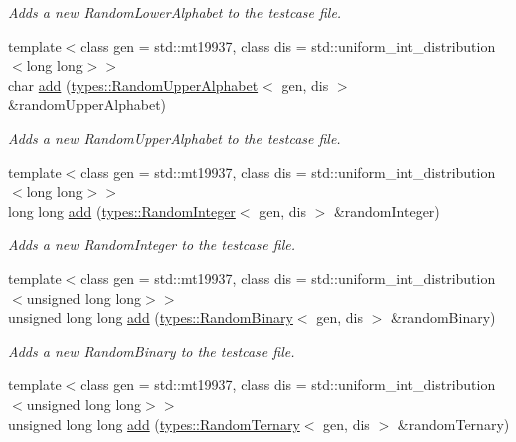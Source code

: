 \begin{DoxyCompactItemize}
\begin{DoxyCompactList}\small\item\em Adds a new Random\+Lower\+Alphabet to the testcase file. \end{DoxyCompactList}\item 
{\footnotesize template$<$class gen  = std\+::mt19937, class dis  = std\+::uniform\+\_\+int\+\_\+distribution$<$long long$>$$>$ }\\char \hyperlink{classtestcaser_1_1maker_1_1TestCaseBuilder_a0d02a42731de8cffd9cc5be67d49290e}{add} (\hyperlink{classtestcaser_1_1maker_1_1types_1_1RandomUpperAlphabet}{types\+::\+Random\+Upper\+Alphabet}$<$ gen, dis $>$ \&random\+Upper\+Alphabet)
\begin{DoxyCompactList}\small\item\em Adds a new Random\+Upper\+Alphabet to the testcase file. \end{DoxyCompactList}\item 
{\footnotesize template$<$class gen  = std\+::mt19937, class dis  = std\+::uniform\+\_\+int\+\_\+distribution$<$long long$>$$>$ }\\long long \hyperlink{classtestcaser_1_1maker_1_1TestCaseBuilder_a2ef119caff9fb4bd1b313964af9e77e0}{add} (\hyperlink{classtestcaser_1_1maker_1_1types_1_1RandomInteger}{types\+::\+Random\+Integer}$<$ gen, dis $>$ \&random\+Integer)
\begin{DoxyCompactList}\small\item\em Adds a new Random\+Integer to the testcase file. \end{DoxyCompactList}\item 
{\footnotesize template$<$class gen  = std\+::mt19937, class dis  = std\+::uniform\+\_\+int\+\_\+distribution$<$unsigned long long$>$$>$ }\\unsigned long long \hyperlink{classtestcaser_1_1maker_1_1TestCaseBuilder_ae00a78ee096f8e1b6a59469445a99b53}{add} (\hyperlink{structtestcaser_1_1maker_1_1types_1_1RandomBinary}{types\+::\+Random\+Binary}$<$ gen, dis $>$ \&random\+Binary)
\begin{DoxyCompactList}\small\item\em Adds a new Random\+Binary to the testcase file. \end{DoxyCompactList}\item 
{\footnotesize template$<$class gen  = std\+::mt19937, class dis  = std\+::uniform\+\_\+int\+\_\+distribution$<$unsigned long long$>$$>$ }\\unsigned long long \hyperlink{classtestcaser_1_1maker_1_1TestCaseBuilder_a4bab625f6da4431125ca3e9eb602eaad}{add} (\hyperlink{structtestcaser_1_1maker_1_1types_1_1RandomTernary}{types\+::\+Random\+Ternary}$<$ gen, dis $>$ \&random\+Ternary)

\end{DoxyCompactItemize}
